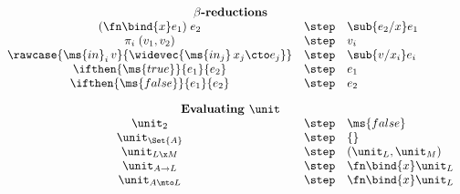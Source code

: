 \begin{figure*}
\begin{minipage}{0.45\textwidth}
  \end{minipage}

  \vspace{1em}\\
  \begin{displaymath}
    \begin{array}{ccl}
      \multicolumn{3}{c}{\textbf{$\beta$-reductions}}\\
      (\fn\bind{x}e_1) \; e_2 &\step& \sub{e_2/x} e_1\\
      \pi_i \; (v_1, v_2) &\step& v_i\\
      \rawcase{\ms{in}_i\,v}{\widevec{\ms{in_j}\,x_j \cto e_j}}
      &\step& \sub{v/x_i} e_i\\
      \ifthen{\ms{true}}{e_1}{e_2} &\step& e_1\\
      \ifthen{\ms{false}}{e_1}{e_2} &\step& e_2

      \vspace{1em}\\
      \multicolumn{3}{c}{\textbf{Evaluating }\unit}\\
      \unit_2 &\step& \ms{false}\\
      \unit_{\Set{A}} &\step& \{\}\\
      \unit_{L \x M} &\step& (\unit_L, \unit_M)\\
      \unit_{A \to L} &\step& \fn\bind{x} \unit_L\\
      \unit_{A \mto L} &\step& \fn\bind{x} \unit_L


\end{array}
\end{displaymath}
\end{figure*}
